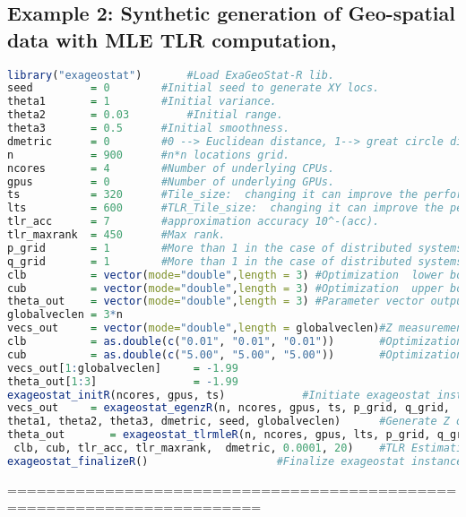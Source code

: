 \documentclass[
10pt, %
a4paper, %
oneside, %
headinclude,footinclude, %
BCOR5mm, %
]{scrartcl}
\begin{document}
\subsection{Example 2: Synthetic generation of Geo-spatial data with MLE TLR computation,}
\begin{lstlisting}[language=R]
library("exageostat") 		#Load ExaGeoStat-R lib.
seed         = 0 		#Initial seed to generate XY locs.
theta1       = 1 		#Initial variance.
theta2       = 0.03 		#Initial range.
theta3       = 0.5 		#Initial smoothness.
dmetric      = 0 		#0 --> Euclidean distance, 1--> great circle distance.
n            = 900 		#n*n locations grid.
ncores       = 4 		#Number of underlying CPUs.
gpus         = 0 		#Number of underlying GPUs.
ts           = 320 		#Tile_size:  changing it can improve the performance. 
lts          = 600 		#TLR_Tile_size:  changing it can improve the performance. 
tlr_acc      = 7 		#approximation accuracy 10^-(acc).
tlr_maxrank  = 450 		#Max rank.
p_grid       = 1 		#More than 1 in the case of distributed systems.
q_grid       = 1 		#More than 1 in the case of distributed systems.
clb          = vector(mode="double",length = 3) #Optimization  lower bounds values.
cub          = vector(mode="double",length = 3) #Optimization  upper bounds values.
theta_out    = vector(mode="double",length = 3) #Parameter vector output.
globalveclen = 3*n
vecs_out     = vector(mode="double",length = globalveclen)#Z measurements of n locations.
clb          = as.double(c("0.01", "0.01", "0.01")) 	  #Optimization lower bounds.
cub          = as.double(c("5.00", "5.00", "5.00"))  	  #Optimization upper bounds.
vecs_out[1:globalveclen]     = -1.99
theta_out[1:3]               = -1.99
exageostat_initR(ncores, gpus, ts) 			  #Initiate exageostat instance.
vecs_out     = exageostat_egenzR(n, ncores, gpus, ts, p_grid, q_grid,
theta1, theta2, theta3, dmetric, seed, globalveclen) 	  #Generate Z observation vector.
theta_out       = exageostat_tlrmleR(n, ncores, gpus, lts, p_grid, q_grid,  vecs_out[1:n],  vecs_out[n+1:(2*n)],  vecs_out[(2*n+1):(3*n)],
 clb, cub, tlr_acc, tlr_maxrank,  dmetric, 0.0001, 20)    #TLR Estimation (MLE).
exageostat_finalizeR() 					  #Finalize exageostat instance.
\end{lstlisting}



========================================================================
\end{document}

